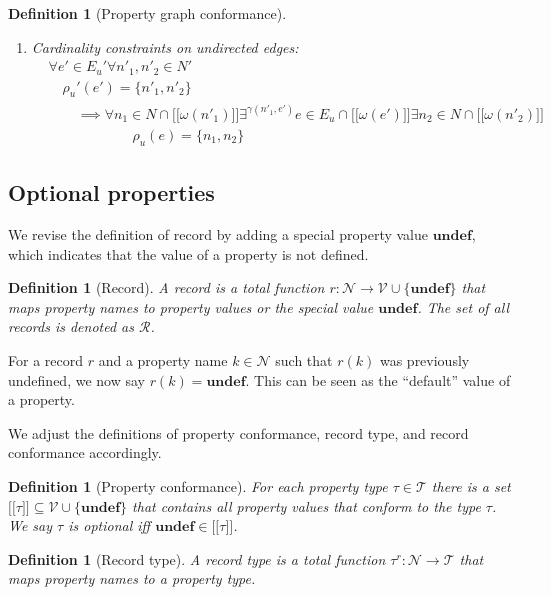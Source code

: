 \documentclass[a4paper]{article}
\newtheorem{definition}[theorem]{Definition}
\newcommand{\ptype}{\tau}
\newcommand{\ptypes}{\mathcal{T}}
\newcommand{\rtype}{\tau^r}
\newcommand{\lsem}{\ensuremath{[\![}}
\newcommand{\rsem}{\ensuremath{]\!]}}
\newcommand{\sem}[1]{\ensuremath{\lsem #1 \rsem}}
\newcommand{\undefined}{\mathbf{undef}}
\begin{document}
\begin{definition}[Property graph conformance]
\begin{enumerate}
    \item Cardinality constraints on undirected edges:
    \begin{align*}
      &\forall e' \in E_u' \forall n'_1, n'_2 \in N'\\
      &\quad\rho_u'(e') = \{n'_1, n'_2\}\\
      &\quad\quad\implies {} \forall n_1 \in N \cap \sem{\omega(n'_1)} \exists^{\gamma(n'_1, e')} e \in E_u \cap \sem{\omega(e')} \exists n_2 \in N \cap \sem{\omega(n'_2)}\\
      &\quad\quad\quad\quad\quad\quad\rho_u(e) = \{n_1, n_2\}
    \end{align*}
  \end{enumerate}
\end{definition}

\subsection{Optional properties}

We revise the definition of record by adding a special property value $\undefined$, which indicates that the value of a property is not defined.

\begin{definition}[Record]
  A \emph{record} is a total function $r : \mathcal{N} \to \mathcal{V} \cup \{\undefined\}$ that maps property names to property values or the special value $\undefined$. The set of all records is denoted as $\mathcal{R}$.
\end{definition}

For a record $r$ and a property name $k \in \mathcal{N}$ such that $r(k)$ was previously undefined, we now say $r(k) = \undefined$. This can be seen as the ``default'' value of a property.

We adjust the definitions of property conformance, record type, and record conformance accordingly.

\begin{definition}[Property conformance]
  For each property type $\ptype \in \ptypes$ there is a set $\sem{\ptype} \subseteq \mathcal{V} \cup \{\undefined\}$ that contains all property values that \emph{conform} to the type $\ptype$. We say $\ptype$ is \emph{optional} iff $\undefined \in \sem{\ptype}$.
\end{definition}

\begin{definition}[Record type]
  A \emph{record type} is a total function $\rtype : \mathcal{N} \to \ptypes$ that maps property names to a property type.
\end{definition}
\end{document}

